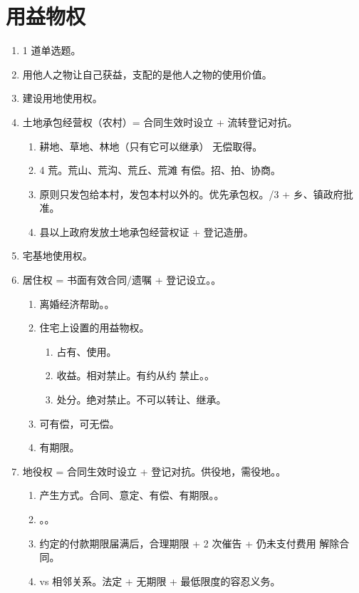 \section{用益物权}
\begin{enumerate}
  \item 1 道单选题。
  \item 用他人之物让自己获益，支配的是他人之物的使用价值。
  \item 建设用地使用权。
  \item 土地承包经营权（农村）= 合同生效时设立 + 流转登记对抗。
        \begin{enumerate}
          \item 耕地、草地、林地（只有它可以继承） \yjt 无偿取得。
          \item 4 荒。荒山、荒沟、荒丘、荒滩 \yjt 有偿。招、拍、协商。
          \item 原则只发包给本村，发包本村以外的。\yi 优先承包权。/3 + 乡、镇政府批准。
          \item 县以上政府发放土地承包经营权证 + 登记造册。
        \end{enumerate}
  \item 宅基地使用权。
  \item 居住权 = 书面有效合同/遗嘱 + 登记设立。。
        \begin{enumerate}
          \item 离婚经济帮助。。
          \item 住宅上设置的用益物权。
                \begin{enumerate}
                  \item 占有、使用。
                  \item 收益。相对禁止。有约从约 \yjt 禁止。。
                  \item 处分。绝对禁止。不可以转让、继承。
                \end{enumerate}
          \item 可有偿，可无偿。
          \item 有期限。
        \end{enumerate}
  \item 地役权 = 合同生效时设立 + 登记对抗。供役地，需役地。。
        \begin{enumerate}
          \item 产生方式。合同、意定、有偿、有期限。。
          \item {}。。
          \item 约定的付款期限届满后，合理期限 + 2 次催告 + 仍未支付费用 \yjt 解除合同。
          \item vs 相邻关系。法定 + 无期限 + 最低限度的容忍义务。
        \end{enumerate}
\end{enumerate}
